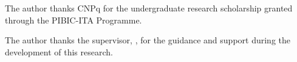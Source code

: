 \label{sec:agradecimentos}

The author thanks CNPq for the undergraduate research scholarship granted through the PIBIC-ITA Programme.

The author thanks the supervisor, \nomeorientador, for the guidance and support during the development of this research.
